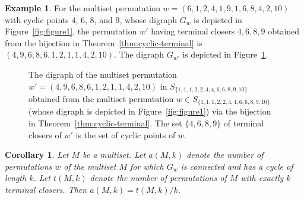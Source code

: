 \documentclass[letterpaper]{amsart}
\theoremstyle{plain}
\newtheorem{corollary}[theorem]{Corollary}
\theoremstyle{definition}
\newtheorem{example}[theorem]{Example}
\theoremstyle{remark}
\begin{document}
\begin{example}
    For the multiset permutation $w=(6, 1, 2, 4, 1, 9, 1, 6, 8, 4, 2, 10)$ with cyclic points $4$, $6$, $8$, and $9$, whose digraph $G_w$ is depicted in Figure~\ref{fig:figure1}, the permutation $w'$ having terminal closers $4,6,8,9$ obtained from the bijection in Theorem~\ref{thm:cyclic-terminal} is
    $(4,9,6,8,6,1,2,1,1,4,2,10)$.
    The digraph $G_{w'}$ is depicted in Figure~\ref{fig:w'}.

    \begin{figure}
        \centering
        
        \caption{The digraph of the multiset permutation $w' = (4,9,6,8,6,1,2,1,1,4,2,10)$ in $S_{\{1, 1, 1, 2, 2, 4, 4, 6, 6, 8, 9, 10\}}$ obtained from the multiset permutation $w \in S_{\{1, 1, 1, 2, 2, 4, 4, 6, 6, 8, 9, 10\}}$ (whose digraph is depicted in Figure~\ref{fig:figure1}) via the bijection in Theorem~\ref{thm:cyclic-terminal}.
        The set $\{4,6,8,9\}$ of terminal closers of $w'$ is the set of cyclic points of $w$.}
        \label{fig:w'}
    \end{figure}
\end{example}

\begin{corollary}\label{cor:t(M,k)-and-a(M,k)}
	Let $M$ be a multiset. Let $a(M, k)$ denote the number of permutations $w$ of the multiset $M$ for which $G_w$ is connected and has a cycle of length $k$. Let $t(M,k)$ denote the number of permutations of $M$ with exactly $k$ terminal closers. Then
	$a(M,k) = t(M,k) / k$.
\end{corollary}
\end{document}
